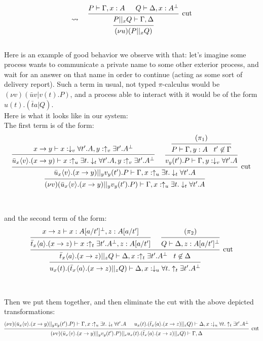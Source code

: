 \documentclass[a4paper,12pt]{article}
\begin{document}
\[\leadsto\;\;\;\;\begin{prooftree}
		\hypo{P \vdash \Gamma,x:A}
		\hypo{Q \vdash \Delta,x:A^\bot}
	\infer2[cut]{P||_xQ \vdash \Gamma,\Delta}
\infer1{(\nu u)(P ||_x Q)}
\end{prooftree}\]
~\\
Here is an example of good behavior we observe with that: let's imagine some process wants to communicate a private name to some other exterior process, and wait for an answer on that name in order to continue (acting as some sort of delivery report). Such a term in usual, not typed $\pi$-calculus would be $(\nu v)(\bar{u}v | v(t).P)$, and a process able to interact with it would be of the form $u(t).(\bar{t}a|Q)$.\\
Here is what it looks like in our system:\\
The first term is of the form:
\[\begin{prooftree}
				\hypo{x\to y \vdash x:\downarrow_v\forall t'.A, y:\uparrow_v\exists t'.A^\bot}
			\infer1{\bar{u}_x\langle v\rangle.(x\to y) \vdash x:\uparrow_u\exists t.\downarrow_t\forall t'.A, y:\uparrow_v\exists t'.A^\bot}
					\hypo{(\pi_1)}
				\infer1{P \vdash \Gamma, y:A\;\;\; t' \not\in \Gamma}
			\infer1{v_y(t').P \vdash \Gamma, y:\downarrow_v\forall t'.A}
		\infer2[cut]{\bar{u}_x\langle v\rangle.(x\to y) ||_y v_y(t').P \vdash \Gamma, x:\uparrow_u\exists t.\downarrow_t\forall t'.A}
	\infer1{(\nu v)(\bar{u}_x\langle v\rangle.(x\to y) ||_y v_y(t').P) \vdash \Gamma, x:\uparrow_u\exists t.\downarrow_t\forall t'.A}
\end{prooftree}\]
~\\~\\
and the second term of the form:
\[\begin{prooftree}
				\hypo{x\to z \vdash x:A[a/t']^\bot, z:A[a/t']}
			\infer1{\bar{t}_x\langle a\rangle.(x\to z) \vdash x:\uparrow_t\exists t'.A^\bot, z:A[a/t']}
				\hypo{(\pi_2)}
			\infer1{Q \vdash \Delta, z:A[a/t']^\bot}
		\infer2[cut]{\bar{t}_x\langle a\rangle.(x\to z) ||_z Q \vdash \Delta, x:\uparrow_t\exists t'.A^\bot\;\;\; t\not\in \Delta}
	\infer1{u_x(t).(\bar{t}_x\langle a\rangle.(x\to z) ||_z Q) \vdash \Delta, x:\downarrow_u\forall t.\uparrow_t\exists t'.A^\bot}
\end{prooftree}\]
~\\~\\
Then we put them together, and then eliminate the cut with the above depicted transformations:
\[\begin{prooftree}
		\hypo{(\nu v)(\bar{u}_x\langle v\rangle.(x\to y) ||_y v_y(t').P) \vdash \Gamma, x:\uparrow_u\exists t.\downarrow_t\forall t'.A}
		\hypo{u_x(t).(\bar{t}_x\langle a\rangle.(x\to z) ||_z Q) \vdash \Delta, x:\downarrow_u\forall t.\uparrow_t\exists t'.A^\bot}
	\infer2[cut]{(\nu v)(\bar{u}_x\langle v\rangle.(x\to y) ||_y v_y(t').P) ||_x u_x(t).(\bar{t}_x\langle a\rangle.(x\to z) ||_z Q) \vdash \Gamma, \Delta}
\end{prooftree}\]
\end{document}

